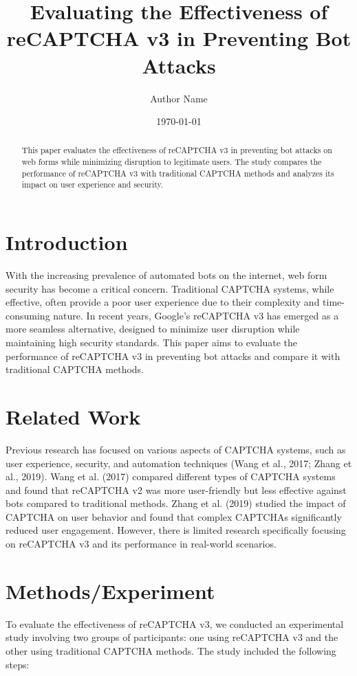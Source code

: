 \documentclass{article}
\title{Evaluating the Effectiveness of reCAPTCHA v3 in Preventing Bot Attacks}
\author{Author Name}
\date{\today}
\begin{document}
\maketitle

\begin{abstract}
This paper evaluates the effectiveness of reCAPTCHA v3 in preventing bot attacks on web forms while minimizing disruption to legitimate users. The study compares the performance of reCAPTCHA v3 with traditional CAPTCHA methods and analyzes its impact on user experience and security.
\end{abstract}

\section{Introduction}
With the increasing prevalence of automated bots on the internet, web form security has become a critical concern. Traditional CAPTCHA systems, while effective, often provide a poor user experience due to their complexity and time-consuming nature. In recent years, Google's reCAPTCHA v3 has emerged as a more seamless alternative, designed to minimize user disruption while maintaining high security standards. This paper aims to evaluate the performance of reCAPTCHA v3 in preventing bot attacks and compare it with traditional CAPTCHA methods.

\section{Related Work}
Previous research has focused on various aspects of CAPTCHA systems, such as user experience, security, and automation techniques (Wang et al., 2017; Zhang et al., 2019). Wang et al. (2017) compared different types of CAPTCHA systems and found that reCAPTCHA v2 was more user-friendly but less effective against bots compared to traditional methods. Zhang et al. (2019) studied the impact of CAPTCHA on user behavior and found that complex CAPTCHAs significantly reduced user engagement. However, there is limited research specifically focusing on reCAPTCHA v3 and its performance in real-world scenarios.

\section{Methods/Experiment}
To evaluate the effectiveness of reCAPTCHA v3, we conducted an experimental study involving two groups of participants: one using reCAPTCHA v3 and the other using traditional CAPTCHA methods. The study included the following steps:
\end{document}
